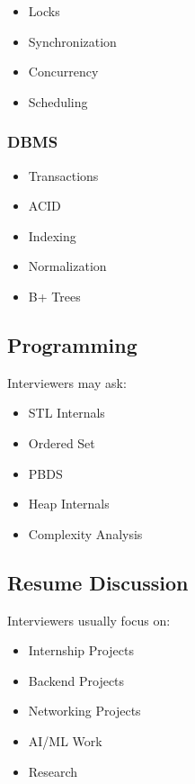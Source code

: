 \documentclass[11pt,a4paper]{article}
\begin{document}
\begin{itemize}
	\item Locks
	\item Synchronization
	\item Concurrency
	\item Scheduling
\end{itemize}

\subsubsection{DBMS}

\begin{itemize}
	\item Transactions
	\item ACID
	\item Indexing
	\item Normalization
	\item B+ Trees
\end{itemize}


\subsection{Programming}

Interviewers may ask:

\begin{itemize}
	\item STL Internals
	\item Ordered Set
	\item PBDS
	\item Heap Internals
	\item Complexity Analysis
\end{itemize}


\subsection{Resume Discussion}

Interviewers usually focus on:

\begin{itemize}
	\item Internship Projects
	\item Backend Projects
	\item Networking Projects
	\item AI/ML Work
	\item Research
\end{itemize}
\end{document}
